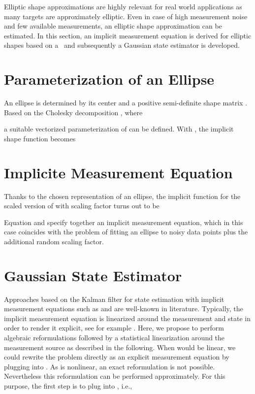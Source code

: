 \documentclass[preprint,1p,11pt]{ISAS_IR}
\begin{document}
Elliptic shape approximations are highly relevant for real world applications as many targets are approximately elliptic.
Even in case of high measurement noise and few available measurements, an elliptic shape approximation  can be estimated.
In this section, an implicit measurement equation is derived for  elliptic shapes based on a  \rhm\ and subsequently a Gaussian state estimator is developed. 


\section{Parameterization of an Ellipse}\label{sec:implict_rep_ellipse}
An ellipse is determined by its center  and a positive semi-definite  shape matrix .
Based on the  Cholesky decomposition , where

a suitable vectorized parameterization   of      can be defined.
With ,  the implicit shape function becomes 


\section{Implicite Measurement Equation}
Thanks to the chosen representation of an ellipse, the  implicit function for the scaled version of  with scaling factor   turns out to be

 Equation  and    specify together an implicit measurement equation, which in this case coincides  with the problem of fitting an ellipse to noisy data points plus the additional random scaling factor.
 

\section{Gaussian State Estimator}\label{ssec:ellipse_bayesest}
 

 
 
 
Approaches based on the Kalman filter for state estimation with implicit measurement equations such as  and   are well-known in literature. Typically, the implicit measurement equation is linearized around the measurement and state in order to render it explicit, see for example \cite{Soatto1996}. Here, we propose to perform algebraic reformulations  followed by a statistical linearization around the measurement source as described in the following. When  would be linear, we could rewrite the problem directly as an explicit measurement equation by plugging  into  . As   is nonlinear,   an exact reformulation is not possible. Nevertheless this reformulation can be performed approximately. For this purpose, the first step is to plug    into , i.e.,
\end{document}
